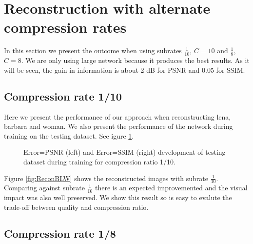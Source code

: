 \FloatBarrier

\section{Reconstruction with alternate compression rates}

In this section we present the outcome when using subrates $\frac{1}{10}$, $C=10$ and $\frac{1}{8}$, $C=8$. We are only using large network because it produces the best results. As it will be seen, the gain in information is about 2 dB for PSNR and 0.05 for SSIM.  

\subsection{Compression rate 1/10}

Here we present the performance of our approach when reconstructing lena, barbara and woman. We also present the performance of the network during training on the testing dataset. See igure \ref{fig:trainTestsub1-10}. 

\begin{figure}[!htb] 
\centering 
{} 
\caption[PSNR and SSIM traning for compression ratio 1/10.]{\color{red}Error=PSNR \color{black}(left) and \color{red}Error=SSIM \color{black}(right) development of testing dataset during training for compression ratio 1/10.}
\label{fig:trainTestsub1-10}
\end{figure}

Figure \ref{fig:ReconBLW} shows the reconstructed images with subrate $\frac{1}{10}$. Comparing against subrate $\frac{1}{16}$ there is an expected improvemented and the visual impact was also well preserved. We show this result so is easy to evalute the trade-off between quality and compression ratio. 


\FloatBarrier

\subsection{Compression rate 1/8}

